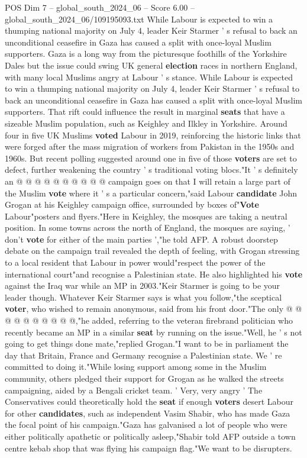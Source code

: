 \begin{textsample}{POS Dim 7 – global\_south\_2024\_06 – Score 6.00 – global\_south\_2024\_06/109195093.txt}  \label{ex:f7_pos_242}
While Labour is expected to win a thumping national majority on July 4, leader Keir Starmer ' s refusal to back an unconditional ceasefire in Gaza has caused a split with once-loyal Muslim supporters.
Gaza is a long way from the picturesque foothills of the Yorkshire Dales but the issue could swing UK general \textbf{election} races in northern England, with many local Muslims angry at Labour ' s stance.
While Labour is expected to win a thumping national majority on July 4, leader Keir Starmer ' s refusal to back an unconditional ceasefire in Gaza has caused a split with once-loyal Muslim supporters.
That rift could influence the result in marginal \textbf{seats} that have a sizeable Muslim population, such as Keighley and Ilkley in Yorkshire.
Around four in five UK Muslims \textbf{voted} Labour in 2019, reinforcing the historic links that were forged after the mass migration of workers from Pakistan in the 1950s and 1960s.
But recent polling suggested around one in five of those \textbf{voters} are set to defect, further weakening the country ' s traditional voting blocs."It ' s definitely an @ @ @ @ @ @ @ @ @ @ campaign goes on that I will retain a large part of the Muslim \textbf{vote} where it ' s a particular concern,"said Labour \textbf{candidate} John Grogan at his Keighley campaign office, surrounded by boxes of"\textbf{Vote} Labour"posters and flyers."Here in Keighley, the mosques are taking a neutral position.
In some towns across the north of England, the mosques are saying, ' don't \textbf{vote} for either of the main parties ',"he told AFP.
A robust doorstep debate on the campaign trail revealed the depth of feeling, with Grogan stressing to a local resident that Labour in power would"respect the power of the international court"and recognise a Palestinian state.
He also highlighted his \textbf{vote} against the Iraq war while an MP in 2003."Keir Starmer is going to be your leader though.
Whatever Keir Starmer says is what you follow,"the sceptical \textbf{voter}, who wished to remain anonymous, said from his front door."The only @ @ @ @ @ @ @ @ @ @,"he added, referring to the veteran firebrand politician who recently became an MP in a similar \textbf{seat} by running on the issue."Well, he ' s not going to get things done mate,"replied Grogan."I want to be in parliament the day that Britain, France and Germany recognise a Palestinian state.
We ' re committed to doing it."While losing support among some in the Muslim community, others pledged their support for Grogan as he walked the streets campaigning, aided by a Bengali cricket team. ' Very, very angry ' The Conservatives could theoretically hold the \textbf{seat} if enough \textbf{voters} desert Labour for other \textbf{candidates}, such as independent Vasim Shabir, who has made Gaza the focal point of his campaign."Gaza has galvanised a lot of people who were either politically apathetic or politically asleep,"Shabir told AFP outside a town centre kebab shop that was flying his campaign flag."We want to be disrupters.

\end{textsample}
